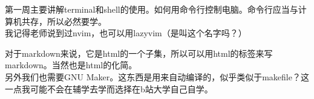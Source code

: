 \documentclass{article}
\begin{document}
第一周主要讲解terminal和shell的使用。如何用命令行控制电脑。命令行应当与计算机共存，所以必然要学。\\
我记得老师说到过nvim，也可以用lazyvim（是叫这个名字吗？）

对于markdown来说，它是html的一个子集，所以可以用html的标签来写markdown。当然也是html的化简。\\

另外我们也需要GNU Maker。这东西是用来自动编译的，似乎类似于makefile？这一点我可能不会在辅学去学而选择在b站大学自己自学。
\end{document}
